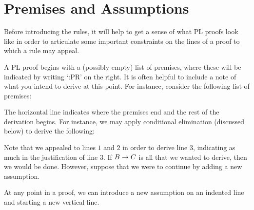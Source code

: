 \section{Premises and Assumptions}
\label{sec:PremiseAssumption}

Before introducing the rules, it will help to get a sense of what PL proofs look like in order to articulate some important constraints on the lines of a proof to which a rule may appeal.

A PL proof begins with a (possibly empty) list of premises, where these will be indicated by writing `:PR' on the right.
It is often helpful to include a note of what you intend to derive at this point.
For instance, consider the following list of premises:
\begin{fitchproof}
   \pr{}
   \pr{}
\end{fitchproof}
The horizontal line indicates where the premises end and the rest of the derivation begins.
For instance, we may apply conditional elimination (discussed below) to derive the following:
\begin{fitchproof}
   \pr{}
   \pr{}
   
\end{fitchproof}
Note that we appealed to lines $1$ and $2$ in order to derive line $3$, indicating as much in the justification of line $3$. 
If $B \rightarrow C$ is all that we wanted to derive, then we would be done. 
However, suppose that we were to continue by adding a new assumption.
\begin{fitchproof}
   \pr{}
   \pr{}
   
  \open
     \as{}
  \close
\end{fitchproof}
At any point in a proof, we can introduce a new assumption on an indented line and starting a new vertical line.
